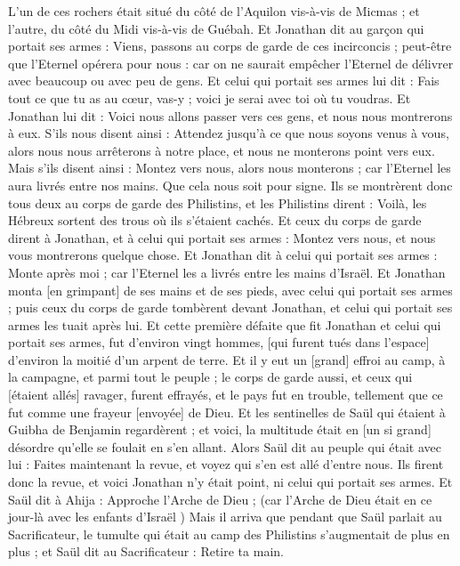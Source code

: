 \begin{multicols}{2}
L'un de ces rochers était situé du côté de l'Aquilon vis-à-vis de Micmas ; et l'autre, du côté du Midi vis-à-vis de Guébah.
Et Jonathan dit au garçon qui portait ses armes : Viens, passons au corps de garde de ces incirconcis ; peut-être que l'Eternel opérera pour nous : car on ne saurait empêcher l'Eternel de délivrer avec beaucoup ou avec peu de gens.
Et celui qui portait ses armes lui dit : Fais tout ce que tu as au cœur, vas-y ; voici je serai avec toi où tu voudras.
Et Jonathan lui dit : Voici nous allons passer vers ces gens, et nous nous montrerons à eux.
S'ils nous disent ainsi : Attendez jusqu'à ce que nous soyons venus à vous, alors nous nous arrêterons à notre place, et nous ne monterons point vers eux.
Mais s'ils disent ainsi : Montez vers nous, alors nous monterons ; car l'Eternel les aura livrés entre nos mains. Que cela nous soit pour signe.
Ils se montrèrent donc tous deux au corps de garde des Philistins, et les Philistins dirent : Voilà, les Hébreux sortent des trous où ils s'étaient cachés.
Et ceux du corps de garde dirent à Jonathan, et à celui qui portait ses armes : Montez vers nous, et nous vous montrerons quelque chose. Et Jonathan dit à celui qui portait ses armes : Monte après moi ; car l'Eternel les a livrés entre les mains d'Israël.
Et Jonathan monta [en grimpant] de ses mains et de ses pieds, avec celui qui portait ses armes ; puis ceux du corps de garde tombèrent devant Jonathan, et celui qui portait ses armes les tuait après lui.
Et cette première défaite que fit Jonathan et celui qui portait ses armes, fut d'environ vingt hommes, [qui furent tués dans l'espace] d'environ la moitié d'un arpent de terre.
Et il y eut un [grand] effroi au camp, à la campagne, et parmi tout le peuple ; le corps de garde aussi, et ceux qui [étaient allés] ravager, furent effrayés, et le pays fut en trouble, tellement que ce fut comme une frayeur [envoyée] de Dieu.
Et les sentinelles de Saül qui étaient à Guibha de Benjamin regardèrent ; et voici, la multitude était en [un si grand] désordre qu'elle se foulait en s'en allant.
Alors Saül dit au peuple qui était avec lui : Faites maintenant la revue, et voyez qui s'en est allé d'entre nous. Ils firent donc la revue, et voici Jonathan n'y était point, ni celui qui portait ses armes.
Et Saül dit à Ahija : Approche l'Arche de Dieu ; (car l'Arche de Dieu était en ce jour-là avec les enfants d'Israël )
Mais il arriva que pendant que Saül parlait au Sacrificateur, le tumulte qui était au camp des Philistins s'augmentait de plus en plus ; et Saül dit au Sacrificateur : Retire ta main.

\end{multicols}
